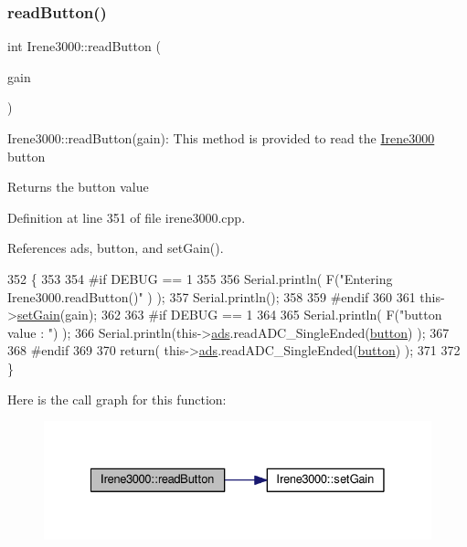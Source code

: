 \subsubsection{\texorpdfstring{read\+Button()}{readButton()}}
{\footnotesize\ttfamily int Irene3000\+::read\+Button (\begin{DoxyParamCaption}\item[{ads\+Gain\+\_\+t}]{gain }\end{DoxyParamCaption})}

Irene3000\+::read\+Button(gain)\+: This method is provided to read the \hyperlink{classIrene3000}{Irene3000} button

\begin{DoxyReturn}{Returns}
the button value 
\end{DoxyReturn}


Definition at line 351 of file irene3000.\+cpp.



References ads, button, and set\+Gain().


\begin{DoxyCode}
352 \{
353 
354 \textcolor{preprocessor}{#if DEBUG == 1 }
355 
356     Serial.println( F(\textcolor{stringliteral}{"Entering Irene3000.readButton()"} ) );
357     Serial.println();
358 
359 \textcolor{preprocessor}{#endif }
360 
361     this->\hyperlink{classIrene3000_aff7c5da186b388e7272e63ff88a20c34}{setGain}(gain);
362 
363 \textcolor{preprocessor}{#if DEBUG == 1}
364     
365     Serial.println( F(\textcolor{stringliteral}{"button value : "}) );
366     Serial.println(this->\hyperlink{classIrene3000_a1215e77ba761c9908d80d691f149e135}{ads}.readADC\_SingleEnded(\hyperlink{Irene3000_8h_a37976ee6fe1fb8546bfd6153b83ffa6c}{button}) );
367 
368 \textcolor{preprocessor}{#endif }
369 
370     \textcolor{keywordflow}{return}( this->\hyperlink{classIrene3000_a1215e77ba761c9908d80d691f149e135}{ads}.readADC\_SingleEnded(\hyperlink{Irene3000_8h_a37976ee6fe1fb8546bfd6153b83ffa6c}{button}) );
371     
372 \}
\end{DoxyCode}
Here is the call graph for this function\+:
\nopagebreak
\begin{figure}[H]
\begin{center}
\leavevmode
\includegraphics[width=328pt]{classIrene3000_ae0e0a5b773c3625b44c1d113c76a1540_cgraph}
\end{center}
\end{figure}
\mbox{\label{classIrene3000_abf3db725fabb0634ec889b32068a5eec}} 
